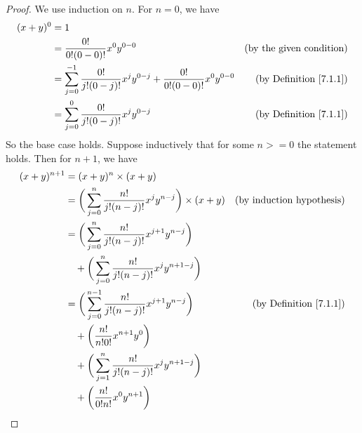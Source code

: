\begin{proof}
    We use induction on \(n\).
    For \(n = 0\), we have
    \begin{align*}
        (x + y)^0 & = 1                                                                                                                                \\
                  & = \frac{0!}{0!(0 - 0)!} x^0 y^{0 - 0}                                                         & \text{(by the given condition)}    \\
                  & = \sum_{j = 0}^{-1} \frac{0!}{j!(0 - j)!} x^j y^{0 - j} + \frac{0!}{0!(0 - 0)!} x^0 y^{0 - 0} & \text{(by Definition \ref{7.1.1})} \\
                  & = \sum_{j = 0}^0 \frac{0!}{j!(0 - j)!} x^j y^{0 - j}                                          & \text{(by Definition \ref{7.1.1})}
    \end{align*}
    So the base case holds.
    Suppose inductively that for some \(n >= 0\) the statement holds.
    Then for \(n + 1\), we have
    \begin{align*}
        (x + y)^{n + 1} & = (x + y)^n \times (x + y)                                                                                                      \\
                        & = \bigg(\sum_{j = 0}^n \frac{n!}{j!(n - j)!} x^j y^{n - j}\bigg) \times (x + y)            & \text{(by induction hypothesis)}   \\
                        & = \bigg(\sum_{j = 0}^n \frac{n!}{j!(n - j)!} x^{j + 1} y^{n - j}\bigg)                                                          \\
                        & \quad + \bigg(\sum_{j = 0}^n \frac{n!}{j!(n - j)!} x^j y^{n + 1 - j}\bigg)                                                      \\
                        & = \bigg(\sum_{j = 0}^{n - 1} \frac{n!}{j!(n - j)!} x^{j + 1} y^{n - j}\bigg)               & \text{(by Definition \ref{7.1.1})} \\
                        & \quad + \bigg(\frac{n!}{n!0!} x^{n + 1} y^0\bigg)                                                                               \\
                        & \quad + \bigg(\sum_{j = 1}^n \frac{n!}{j!(n - j)!} x^j y^{n + 1 - j}\bigg)                                                      \\
                        & \quad + \bigg(\frac{n!}{0!n!} x^0 y^{n + 1}\bigg)                                                                               \\

\end{align*}
\end{proof}
